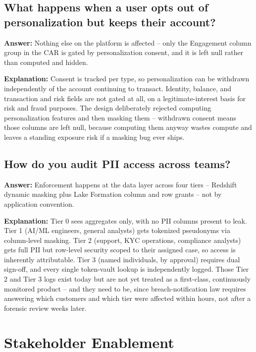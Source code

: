 \documentclass[11pt]{article}
\begin{document}
\subsection{What happens when a user opts out of personalization but keeps their account?}
\textbf{Answer:} Nothing else on the platform is affected -- only the Engagement column group in the CAR is gated by personalization consent, and it is left null rather than computed and hidden.

\textbf{Explanation:} Consent is tracked per type, so personalization can be withdrawn independently of the account continuing to transact. Identity, balance, and transaction and risk fields are not gated at all, on a legitimate-interest basis for risk and fraud purposes. The design deliberately rejected computing personalization features and then masking them -- withdrawn consent means those columns are left null, because computing them anyway wastes compute and leaves a standing exposure risk if a masking bug ever ships.

\subsection{How do you audit PII access across teams?}
\textbf{Answer:} Enforcement happens at the data layer across four tiers -- Redshift dynamic masking plus Lake Formation column and row grants -- not by application convention.

\textbf{Explanation:} Tier 0 sees aggregates only, with no PII columns present to leak. Tier 1 (AI/ML engineers, general analysts) gets tokenized pseudonyms via column-level masking. Tier 2 (support, KYC operations, compliance analysts) gets full PII but row-level security scoped to their assigned case, so access is inherently attributable. Tier 3 (named individuals, by approval) requires dual sign-off, and every single token-vault lookup is independently logged. Those Tier 2 and Tier 3 logs exist today but are not yet treated as a first-class, continuously monitored product -- and they need to be, since breach-notification law requires answering which customers and which tier were affected within hours, not after a forensic review weeks later.

\section{Stakeholder Enablement}
\end{document}
